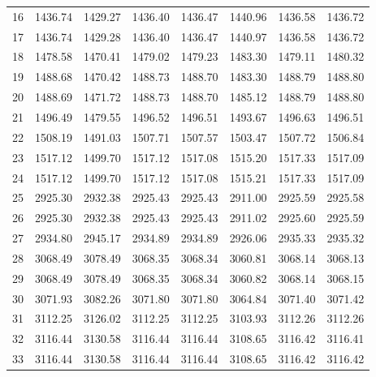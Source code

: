 \documentclass[10pt,oneside]{article}
\begin{document}
\begin{table}[h!]
\begin{tabular}{cccccccc}
16 &   1436.74 & 1429.27 & 1436.40 & 1436.47 &      1440.96 & 1436.58 & 1436.72 \\
17 &   1436.74 & 1429.28 & 1436.40 & 1436.47 &      1440.97 & 1436.58 & 1436.72 \\
18 &   1478.58 & 1470.41 & 1479.02 & 1479.23 &      1483.30 & 1479.11 & 1480.32 \\
19 &   1488.68 & 1470.42 & 1488.73 & 1488.70 &      1483.30 & 1488.79 & 1488.80 \\
20 &   1488.69 & 1471.72 & 1488.73 & 1488.70 &      1485.12 & 1488.79 & 1488.80 \\
21 &   1496.49 & 1479.55 & 1496.52 & 1496.51 &      1493.67 & 1496.63 & 1496.51 \\
22 &   1508.19 & 1491.03 & 1507.71 & 1507.57 &      1503.47 & 1507.72 & 1506.84 \\
23 &   1517.12 & 1499.70 & 1517.12 & 1517.08 &      1515.20 & 1517.33 & 1517.09 \\
24 &   1517.12 & 1499.70 & 1517.12 & 1517.08 &      1515.21 & 1517.33 & 1517.09 \\
25 &   2925.30 & 2932.38 & 2925.43 & 2925.43 &      2911.00 & 2925.59 & 2925.58 \\
26 &   2925.30 & 2932.38 & 2925.43 & 2925.43 &      2911.02 & 2925.60 & 2925.59 \\
27 &   2934.80 & 2945.17 & 2934.89 & 2934.89 &      2926.06 & 2935.33 & 2935.32 \\
28 &   3068.49 & 3078.49 & 3068.35 & 3068.34 &      3060.81 & 3068.14 & 3068.13 \\
29 &   3068.49 & 3078.49 & 3068.35 & 3068.34 &      3060.82 & 3068.14 & 3068.15 \\
30 &   3071.93 & 3082.26 & 3071.80 & 3071.80 &      3064.84 & 3071.40 & 3071.42 \\
31 &   3112.25 & 3126.02 & 3112.25 & 3112.25 &      3103.93 & 3112.26 & 3112.26 \\
32 &   3116.44 & 3130.58 & 3116.44 & 3116.44 &      3108.65 & 3116.42 & 3116.41 \\
33 &   3116.44 & 3130.58 & 3116.44 & 3116.44 &      3108.65 & 3116.42 & 3116.42 \\
\bottomrule
\end{tabular}
\end{table}

\clearpage
\end{document}
